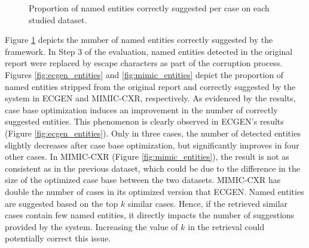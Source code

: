 \begin{figure}[t!]
    \centering
    \caption{Proportion of named entities correctly suggested per case on each studied dataset.}
    \label{fig:entities_comparison}
\end{figure}

Figure \ref{fig:entities_comparison} depicts the number of named entities correctly suggested by the framework. In Step 3 of the evaluation, named entities detected in the original report were replaced by escape characters as part of the corruption process. Figures \ref{fig:ecgen_entities} and \ref{fig:mimic_entities} depict the proportion of named entities stripped from the original report and correctly suggested by the system in ECGEN and MIMIC-CXR, respectively. As evidenced by the results, case base optimization induces an improvement in the number of correctly suggested entities. This phenomenon is clearly observed in ECGEN's results (Figure \ref{fig:ecgen_entities}). Only in three cases, the number of detected entities slightly decreases after case base optimization, but significantly improves in four other cases. In MIMIC-CXR (Figure \ref{fig:mimic_entities}), the result is not as consistent as in the previous dataset, which could be due to the difference in the size of the optimized case base between the two datasets. MIMIC-CXR has double the number of cases in its optimized version that ECGEN. Named entities are suggested based on the top $k$ similar cases. Hence, if the retrieved similar cases contain few named entities, it directly impacts the number of suggestions provided by the system. Increasing the value of $k$ in the retrieval could potentially correct this issue.

